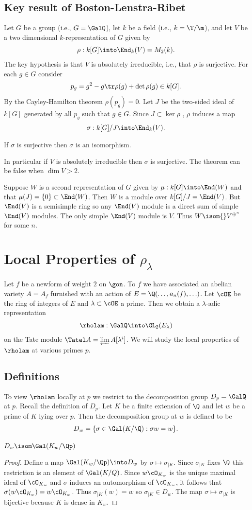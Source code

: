 \documentclass{report}
\begin{document}
\section{Key result of Boston-Lenstra-Ribet}
Let $G$ be a group (i.e., $G=\GalQ$), let
$k$ be a field (i.e., $k=\T/\m$), and let
$V$ be a two dimensional $k$-representation of $G$
given by $$\rho:k[G]\into\End_k(V)=M_2(k).$$
The key hypothesis is that $V$ is absolutely irreducible,
i.e., that $\rho$ is surjective. For each $g\in G$ consider
$$p_g=g^2-g\tr\rho(g)+\det\rho(g)\in k[G].$$
By the Cayley-Hamilton theorem $\rho(p_g)=0$.
Let $J$ be the two-sided ideal of $k[G]$ generated
by all $p_g$ such that $g\in G$. Since $J\subset\ker\rho$
, $\rho$ induces a map
$$\sigma:k[G]/J\into \End_k(V).$$
\begin{theorem} If $\sigma$ is surjective
then $\sigma$ is an isomorphism.
\end{theorem}
In particular if $V$ is absolutely irreducible then
$\sigma$ is surjective. The theorem can be false when $\dim V>2$.

Suppose $W$ is a second representation of $G$ given by
$\mu:k[G]\into\End(W)$ and that $\mu(J)=\{0\}\subset\End(W)$.
Then $W$ is a module over $k[G]/J=\End(V)$.
But $\End(V)$ is a semisimple ring so any $\End(V)$ module
is a direct sum of simple $\End(V)$ modules. The only simple
$\End(V)$ module is $V$. Thus $W\isom{}V^{\oplus ^n}$ for some $n$.


\chapter{Local Properties of $\rho_{\lambda}$}
Let $f$ be a newform of weight $2$ on $\gon$. To $f$ we have associated
an abelian variety $A=A_f$ furnished with an action of
$E=\Q(\ldots,a_n(f),\ldots)$. Let $\cOE$ be the ring of
integers of $E$ and $\lambda\subset\cOE$ a prime. Then we obtain
a $\lambda$-adic representation
$$\rholam:\GalQ\into\GL_2(E_{\lambda})$$
on the Tate module $\Tatel A=\varprojlim A[\lambda^i]$.
We will study the local properties of $\rholam$ at various
primes $p$.
\section{Definitions}\label{def:decompgroup}
To view $\rholam$ locally at $p$ we restrict to the
decomposition group $D_p=\GalQ$ at $p$. Recall the
definition of $D_p$.
Let $K$ be a finite extension of $\Q$ and let $w$ be a prime
of $K$ lying over $p$.
Then the decomposition group at $w$
is defined to be
$$D_w=\{\sigma\in\Gal(K/\Q) : \sigma w =w\}.$$
\begin{proposition} $D_w\isom\Gal(K_w/\Qp)$ \end{proposition}
\begin{proof} Define a map $\Gal(K_w/\Qp)\into D_w$ by
$\sigma\mapsto\sigma_{|K}$. Since $\sigma_{|K}$ fixes
$\Q$ this restriction is an element of $\Gal(K/Q)$.
Since $w\cO_{K_w}$ is the unique maximal ideal of $\cO_{K_w}$
and $\sigma$ induces an automorphism of $\cO_{K_w}$, it follows that
$\sigma(w\cO_{K_w})=w\cO_{K_w}$. Thus $\sigma_{|K}(w)=w$ so
$\sigma_{|K}\in D_w$. The map $\sigma\mapsto \sigma_{|K}$ is
bijective because $K$ is dense in $K_w$.\end{proof}
\end{document}
